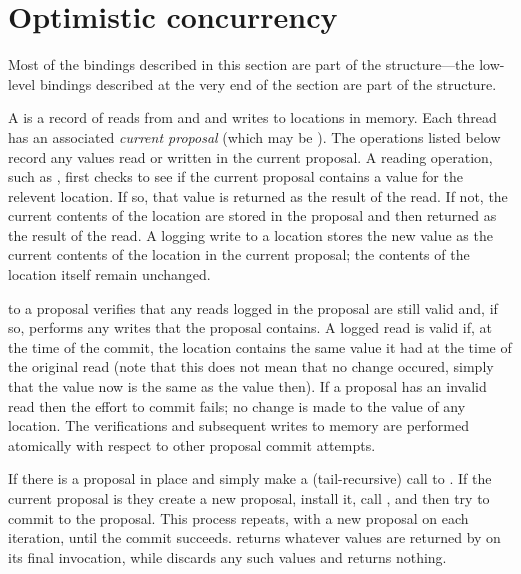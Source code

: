 \section{Optimistic concurrency}
\label{sec:optimistic-concurrency}

Most of the bindings described in this section are part of the 
structure---the low-level bindings described at the very end of the
section are part of the  structure.

A  is a record of reads from and and writes to locations in
 memory.  Each thread has an associated \textit{current proposal}
 (which may be ).
The  operations listed below record any values read or
 written in the current proposal.
A reading operation, such as , first checks to
 see if the current proposal contains a value for the relevent location.
If so, that value is returned as the result of the read.
If not, the current contents of the location are stored in the proposal and
 then returned as the result of the read.
A logging write to a location stores the new value as the current contents of
 the location in the current proposal; the contents of the location itself
 remain unchanged.

 to a proposal verifies that any reads logged in
 the proposal are still valid and, if so, performs any writes that
 the proposal contains.
A logged read is valid if, at the time of the commit, the location contains
 the same value it had at the time of the original read (note that this does
 not mean that no change occured, simply that the value now is the same as
 the value then).
If a proposal has an invalid read then the effort to commit fails; no change
 is made to the value of any location.
The verifications and subsequent writes to memory are performed atomically
 with respect to other proposal commit attempts.

\begin{protos}
\end{protos}
\noindent
If there is a proposal in place 
  and 
 simply make a (tail-recursive) call to .
If the current proposal is  they create a new proposal,
 install it, call , and then try to commit to the proposal.
This process repeats, with a new proposal on each iteration, until
 the commit succeeds.
 returns whatever values are returned by 
 on its final invocation, while  discards any such
 values and returns nothing.


